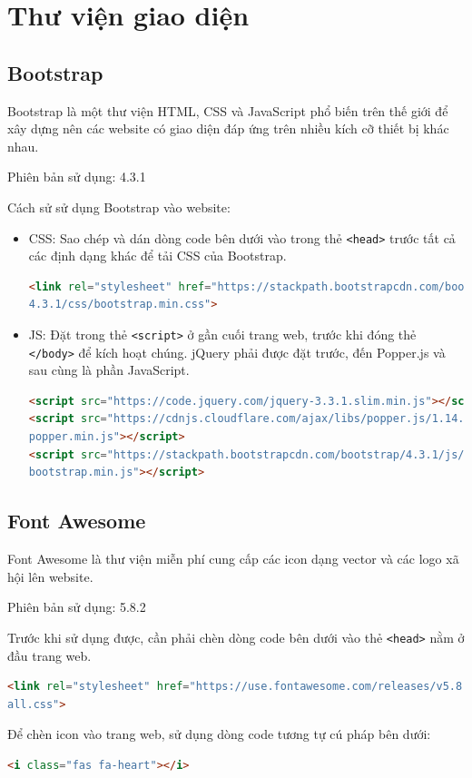 \section{Thư viện giao diện}
\subsection{Bootstrap}
Bootstrap là một thư viện HTML, CSS và JavaScript phổ biến trên thế giới để xây dựng nên các website có giao diện đáp ứng trên nhiều kích cỡ thiết bị khác nhau\cite{bootstrap}.
\par
Phiên bản sử dụng: 4.3.1
\par
Cách sử sử dụng Bootstrap vào website:
\begin{itemize}
 	\item CSS: Sao chép và dán dòng code bên dưới vào trong thẻ \texttt{<head>} trước tất cả các định dạng khác để tải CSS của Bootstrap.
 	\begin{lstlisting}[language=HTML]
<link rel="stylesheet" href="https://stackpath.bootstrapcdn.com/bootstrap/
4.3.1/css/bootstrap.min.css">
	\end{lstlisting}
	\item JS: Đặt trong thẻ \texttt{<script>} ở gần cuối trang web, trước khi đóng thẻ \texttt{</body>} để kích hoạt chúng. jQuery phải được đặt trước, đến Popper.js và sau cùng là phần JavaScript.
	\begin{lstlisting}[language=HTML]
<script src="https://code.jquery.com/jquery-3.3.1.slim.min.js"></script>
<script src="https://cdnjs.cloudflare.com/ajax/libs/popper.js/1.14.7/umd/
popper.min.js"></script>
<script src="https://stackpath.bootstrapcdn.com/bootstrap/4.3.1/js/
bootstrap.min.js"></script>
	\end{lstlisting}
\end{itemize}
\subsection{Font Awesome}
Font Awesome là thư viện miễn phí cung cấp các icon dạng vector và các logo xã hội lên website\cite{awesome}.
\par
Phiên bản sử dụng: 5.8.2
\par
Trước khi sử dụng được, cần phải chèn dòng code bên dưới vào thẻ \texttt{<head>} nằm ở đầu trang web.
\begin{lstlisting}[language=HTML]
<link rel="stylesheet" href="https://use.fontawesome.com/releases/v5.8.2/css/
all.css">
\end{lstlisting}
\par
Để chèn icon vào trang web, sử dụng dòng code tương tự cú pháp bên dưới:
\begin{lstlisting}[language=HTML]
<i class="fas fa-heart"></i>
\end{lstlisting}

